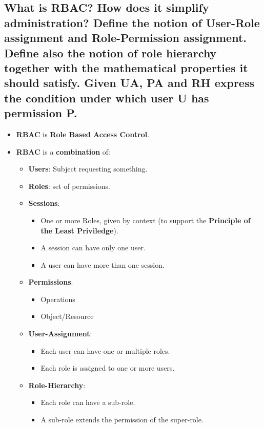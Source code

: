 \documentclass[9pt, letterpaper]{article}
\begin{document}
\subsection{What is RBAC? How does it simplify administration? Define the notion of User-Role assignment and Role-Permission assignment. Define also the notion of role hierarchy together with the mathematical properties it should satisfy. Given UA, PA and RH express the condition under which user U has permission P.}
\begin{itemize}
	\item \textbf{RBAC} is \textbf{Role Based Access Control}.
	\item \textbf{RBAC} is a \textbf{combination} of:
	      \begin{itemize}
		      \item \textbf{Users}: Subject requesting something.
		      \item \textbf{Roles}: set of permissions.
		      \item \textbf{Sessions}:
		            \begin{itemize}
			            \item One or more Roles, given by context (to support the \textbf{Principle of the Least Priviledge}).
			            \item A session can have only one user.
			            \item A user can have more than one session.
		            \end{itemize}
		      \item \textbf{Permissions}:
		            \begin{itemize}
			            \item Operations
			            \item Object/Resource
		            \end{itemize}
		      \item \textbf{User-Assignment}:
		            \begin{itemize}
			            \item Each user can have one or multiple roles.
			            \item Each role is assigned to one or more users.
		            \end{itemize}
		      \item \textbf{Role-Hierarchy}:
		            \begin{itemize}
			            \item Each role can have a sub-role.
			            \item A sub-role extends the permission of the super-role.

\end{itemize}
\end{itemize}
\end{itemize}
\end{document}
